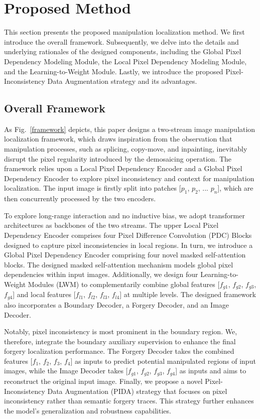 \documentclass[10pt,journal,compsoc]{IEEEtran}
\begin{document}
\section{Proposed Method}
This section presents the proposed manipulation localization method. We first introduce the overall framework. Subsequently, we delve into the details and underlying rationales of the designed components, including the Global Pixel Dependency Modeling Module, the Local Pixel Dependency Modeling Module, and the Learning-to-Weight Module. Lastly, we introduce the proposed Pixel-Inconsistency Data Augmentation strategy and its advantages. 

\subsection{Overall Framework}
As Fig.~\ref{framework} depicts, this paper designs a two-stream image manipulation localization framework, which draws inspiration from the observation that manipulation processes, such as splicing, copy-move, and inpainting, inevitably disrupt the pixel regularity introduced by the demosaicing operation. The framework relies upon a Local Pixel Dependency Encoder and a Global Pixel Dependency Encoder to explore pixel inconsistency and context for manipulation localization. The input image is firstly split into  patches [$p_{1}$, $p_{2}$, ... $p_{n}$], which are then concurrently processed by the two encoders.
 
To explore long-range interaction and no inductive bias, we adopt transformer architectures as backbones of the two streams. The upper Local Pixel Dependency Encoder comprises four Pixel Difference Convolution (PDC) Blocks designed to capture pixel inconsistencies in local regions. 
In turn, we introduce a Global Pixel Dependency Encoder comprising four novel masked self-attention blocks. The designed masked self-attention mechanism models global pixel dependencies within input images. Additionally, we design four Learning-to-Weight Modules (LWM) to complementarily combine global features [$f_{g1}$, $f_{g2}$, $f_{g3}$, $f_{g4}$] and local features [$f_{l1}$, $f_{l2}$, $f_{l3}$, $f_{l4}$] at multiple levels. The designed framework also incorporates a Boundary Decoder, a Forgery Decoder, and an Image Decoder. 

Notably, pixel inconsistency is most prominent in the boundary region. We, therefore, integrate the boundary auxiliary supervision to enhance the final forgery localization performance. The Forgery Decoder takes the combined features [$f_{1}$, $f_{2}$, $f_{3}$, $f_{4}$] as inputs to predict potential manipulated regions of input images, while the Image Decoder takes [$f_{g1}$, $f_{g2}$, $f_{g3}$, $f_{g4}$] as inputs and aims to reconstruct the original input image.  
Finally, we propose a novel Pixel-Inconsistency Data Augmentation (PIDA) strategy that focuses on pixel inconsistency rather than semantic forgery traces. This strategy further enhances the model's generalization and robustness capabilities. 
 
\end{document}

